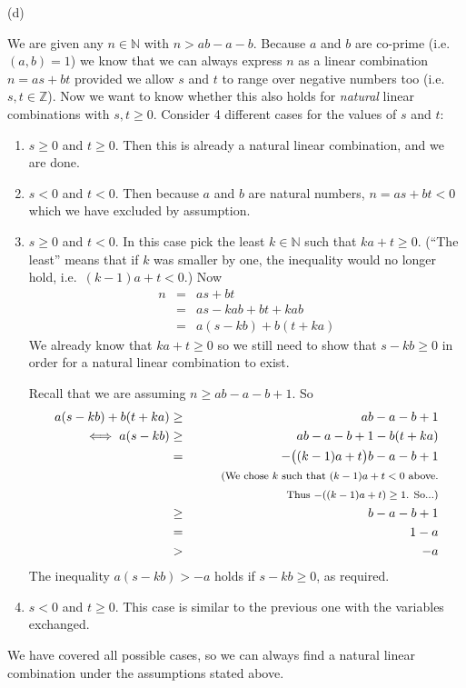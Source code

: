 \documentclass{article}
\begin{document}
(d)

We are given any $n \in \mathbb{N}$ with $n > ab-a-b$. Because $a$ and $b$ are
co-prime (i.e.\ $(a,b)=1$) we know that we can always express $n$ as a linear
combination $n=as+bt$ provided we allow $s$ and $t$ to range over negative
numbers too (i.e.\ $s,t \in \mathbb{Z}$). Now we want to know whether this
also holds for \emph{natural} linear combinations with $s,t \ge 0$.
Consider 4 different cases for the values of $s$ and $t$:
\begin{enumerate}
\item $s \ge 0$ and $t \ge 0$. Then this is already a natural linear combination,
and we are done.

\item $s < 0$ and $t < 0$. Then because $a$ and $b$ are natural numbers,
$n=as+bt<0$ which we have excluded by assumption.

\item $s \ge 0$ and $t < 0$. In this case pick the least $k \in \mathbb{N}$
such that $ka+t \ge 0$. (``The least'' means that if $k$ was smaller by one,
the inequality would no longer hold, i.e.\ $(k-1)a+t<0$.) Now
\begin{eqnarray*}
n &=& as + bt\\
&=& as - kab + bt + kab\\
&=& a(s-kb) + b(t+ka)
\end{eqnarray*}
We already know that $ka+t \ge 0$ so we still need to show that $s-kb \ge 0$ in
order for a natural linear combination to exist.

Recall that we are assuming $n \ge ab-a-b+1$. So
\begin{eqnarray*}
a(s-kb) + b(t+ka) &\ge& ab-a-b+1 \\
\iff a(s-kb) &\ge& ab-a-b+1-b(t+ka) \\
&=& -\big((k-1)a+t\big)b - a - b + 1 \\
&& \quad\quad\mbox{\footnotesize (We chose $k$ such that $(k-1)a+t<0$ above.} \\
&& \quad\quad\mbox{\footnotesize Thus $-((k-1)a+t) \ge 1$. So...)} \\
&\ge& b - a - b + 1 \\
&=& 1 - a \\
&>& -a
\end{eqnarray*}
The inequality $a(s-kb) > -a$ holds if $s-kb \ge 0$, as required.

\item $s < 0$ and $t \ge 0$. This case is similar to the previous one with the
variables exchanged.
\end{enumerate}
We have covered all possible cases, so we can always find a natural linear
combination under the assumptions stated above.
\end{document}
